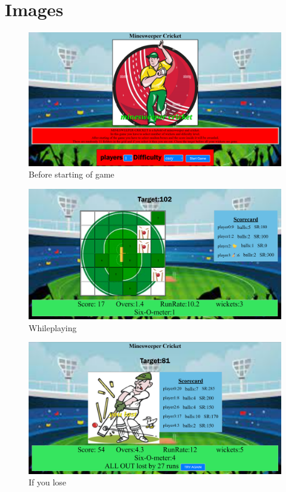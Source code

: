 \documentclass{article}
\begin{document}
\section{Images}
\begin{figure}[H]
    \centering
    \includegraphics[width=1\textwidth]{homepage}
    \caption{Before starting of game}
    \label{fig:enter-label}
\end{figure}
\begin{figure}[H]
    \centering
    \includegraphics[width=1\textwidth]{inbetweena5wicketgame.png}
    \caption{Whileplaying}
    \label{fig:enter-label}
\end{figure}
\begin{figure}[H]
    \centering
    \includegraphics[width=1\textwidth]{Ifyoulose.png}
    \caption{If you lose}
    \label{fig:enter-label}
\end{figure}
\end{document}
